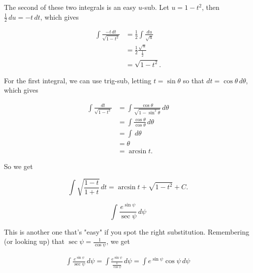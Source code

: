 \documentclass[12pt, letterpaper]{article}
\begin{document}
The second of these two integrals is an easy $u$-sub. Let $u = 1 - t^2$, then $\tfrac{1}{2}\, du = -t\, dt$, which gives

\begin{equation*}
\begin{aligned}
\int \frac{-t \, dt}{\sqrt{1 - t^2}}
  &= \tfrac{1}{2} \int \frac{du}{\sqrt{u}} \\[0.2in]
  &= \tfrac{1}{2} \frac{\sqrt{u}}{\frac{1}{2}} \\[0.2in]
  &= \sqrt{1 - t^2}.
\end{aligned}
\end{equation*}

For the first integral, we can use trig-sub, letting $t = \sin{\theta}$ so that $dt = \cos{\theta} \, d\theta$, which gives

\begin{equation*}
\begin{aligned}
\int \frac{dt}{\sqrt{1 - t^2}}
  &= \int \frac{\cos{\theta}}{\sqrt{1 - \sin^2{\theta}}} \, d\theta \\[0.2in]
  &= \int \frac{\cos{\theta}}{\cos{\theta}} \, d\theta \\[0.2in]
  &= \int \, d\theta \\[0.2in]
  &= \theta \\[0.2in]
  &= \arcsin{t}.
\end{aligned}
\end{equation*}

So we get

\begin{equation*}
\boxed
{
\int \sqrt{\frac{1 - t}{1 + t}} \, dt
  = \arcsin{t} + \sqrt{1 - t^2} + C.
}
\end{equation*}








\newpage

$$ \int \frac{e^{\sin{\psi}}}{\sec{\psi}} \, d\psi $$

This is another one that's "easy" if you spot the right substitution. Remembering (or looking up) that $\sec{\psi} = \frac{1}{\cos{\psi}}$, we get

\begin{equation*}
\begin{aligned}
\int \frac{e^{\sin{\psi}}}{\sec{\psi}} \, d\psi
  = \int \frac{e^{\sin{\psi}}}{\frac{1}{\cos{\psi}}} \, d\psi
  = \int e^{\sin{\psi}}\cos{\psi} \, d\psi
\end{aligned}
\end{equation*}
\end{document}
